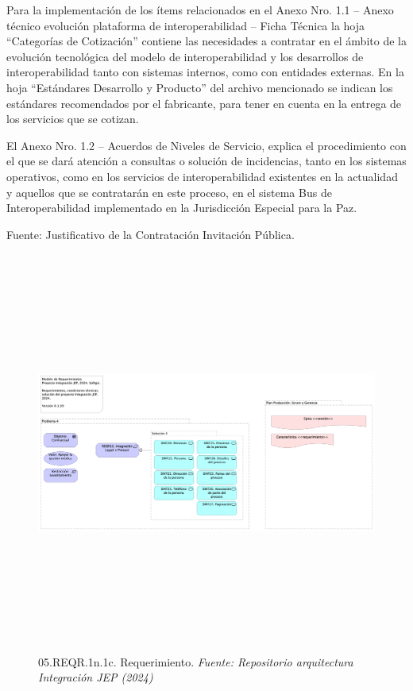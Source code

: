 \documentclass[
  paper=a4,
  ,captions=tableheading
]{scrartcl}
\begin{document}
Para la implementación de los ítems relacionados en el Anexo Nro. 1.1 --
Anexo técnico evolución plataforma de interoperabilidad -- Ficha Técnica
la hoja ``Categorías de Cotización'' contiene las necesidades a
contratar en el ámbito de la evolución tecnológica del modelo de
interoperabilidad y los desarrollos de interoperabilidad tanto con
sistemas internos, como con entidades externas. En la hoja ``Estándares
Desarrollo y Producto'' del archivo mencionado se indican los estándares
recomendados por el fabricante, para tener en cuenta en la entrega de
los servicios que se cotizan.

El Anexo Nro. 1.2 -- Acuerdos de Niveles de Servicio, explica el
procedimiento con el que se dará atención a consultas o solución de
incidencias, tanto en los sistemas operativos, como en los servicios de
interoperabilidad existentes en la actualidad y aquellos que se
contratarán en este proceso, en el sistema Bus de Interoperabilidad
implementado en la Jurisdicción Especial para la Paz.

Fuente: Justificativo de la Contratación Invitación Pública.

\begin{figure}
\centering
\includegraphics[width=\textwidth,height=5.20833in]{images/05.REQR.1n.1c.Requerimiento.png}
\caption{05.REQR.1n.1c. Requerimiento. \emph{Fuente: Repositorio
arquitectura Integración JEP
(2024)}}\label{fig:id-66863a85ffda49fea776ab5314fffd5e}
\end{figure}
\end{document}
